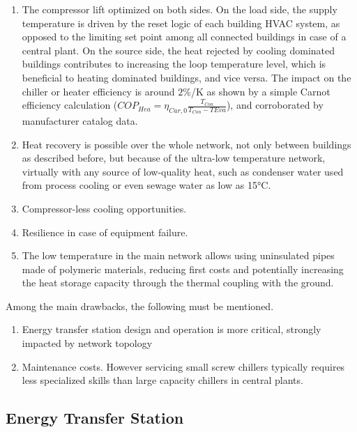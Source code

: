 \begin{enumerate}

    \item The compressor lift optimized on both sides. On the load side, the supply temperature is driven by the reset logic of each building HVAC system, as opposed to the limiting set point among all connected buildings in case of a central plant. On the source side, the heat rejected by cooling dominated buildings contributes to increasing the loop temperature level, which is beneficial to heating dominated buildings, and vice versa. The impact on the chiller or heater efficiency is around $2$\%/K as shown by a simple Carnot efficiency calculation ($COP_{Hea} = \eta_{Car, 0} \frac{T_{Con}}{T_{Con}-T{Eva}}$), and corroborated by manufacturer catalog data.

    \item Heat recovery is possible over the whole network, not only between buildings as described before, but because of the ultra-low temperature network, virtually with any source of low-quality heat, such as condenser water used from process cooling or even sewage water as low as 15°C.

    \item Compressor-less cooling opportunities.

    \item Resilience in case of equipment failure.

    \item The low temperature in the main network allows using uninsulated pipes made of polymeric materials, reducing first costs and potentially increasing the heat storage capacity through the thermal coupling with the ground.

\end{enumerate}

Among the main drawbacks, the following must be mentioned.
\begin{enumerate}
    \item Energy transfer station design and operation is more critical, strongly impacted by network topology

    \item Maintenance costs. However servicing small screw chillers typically requires less specialized skills than large capacity chillers in central plants.
\end{enumerate}


\subsection{Energy Transfer Station} \label{sec:ets}

